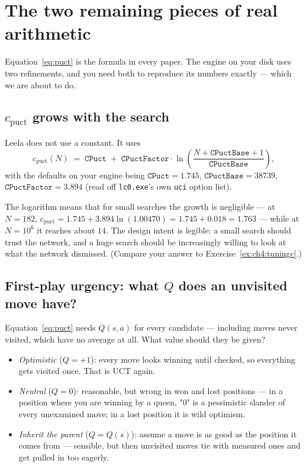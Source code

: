 \section{The two remaining pieces of real arithmetic}

Equation~\eqref{eq:puct} is the formula in every paper. The engine on your disk uses two
refinements, and you need both to reproduce its numbers exactly --- which we are about to do.

\subsection{$c_{\text{puct}}$ grows with the search}

Leela does not use a constant. It uses
\begin{equation}
  \label{eq:cpuctgrow}
  c_{\text{puct}}(N) \;=\; \texttt{CPuct} \;+\; \texttt{CPuctFactor}\cdot
  \ln\!\left(\frac{N + \texttt{CPuctBase} + 1}{\texttt{CPuctBase}}\right),
\end{equation}
with the defaults on your engine being $\texttt{CPuct} = 1.745$,
$\texttt{CPuctBase} = 38739$, $\texttt{CPuctFactor} = 3.894$ (read off
\texttt{lc0.exe}'s own \texttt{uci} option list).

The logarithm means that for small searches the growth is negligible --- at $N = 182$,
$c_{\text{puct}} = 1.745 + 3.894\ln(1.00470) = 1.745 + 0.018 = 1.763$ --- while at
$N = 10^6$ it reaches about $14$. The design intent is legible: a small search should trust
the network, and a huge search should be increasingly willing to look at what the network
dismissed. (Compare your answer to Exercise~\ref{ex:ch4:tuningc}.)

\subsection{First-play urgency: what $Q$ does an unvisited move have?}

Equation~\eqref{eq:puct} needs $Q(s,a)$ for every candidate --- including moves never visited,
which have no average at all. What value should they be given?

\begin{itemize}
\item \emph{Optimistic} ($Q = +1$): every move looks winning until checked, so everything gets
  visited once. That is UCT again.
\item \emph{Neutral} ($Q = 0$): reasonable, but wrong in won and lost positions --- in a
  position where you are winning by a queen, "0" is a pessimistic slander of every unexamined
  move; in a lost position it is wild optimism.
\item \emph{Inherit the parent} ($Q = Q(s)$): assume a move is as good as the position it
  comes from --- sensible, but then unvisited moves tie with measured ones and get pulled in
  too eagerly.
\end{itemize}

